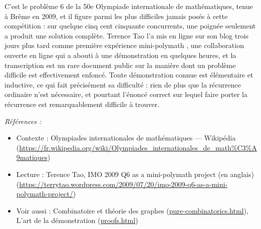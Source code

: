 \documentclass[11pt]{article}
\newenvironment{refs}{\par\small\noindent\emph{Références :}\begin{itemize}\setlength\itemsep{0pt}}{\end{itemize}\normalsize}
\begin{document}
\noindent C'est le problème 6 de la 50e Olympiade internationale de mathématiques, tenue à Brême en 2009, et il figure parmi les plus difficiles jamais posés à cette compétition : sur quelque cinq cent cinquante concurrents, une poignée seulement a produit une solution complète. Terence Tao l'a mis en ligne sur son blog trois jours plus tard comme première expérience \og{} mini-polymath \fg{}, une collaboration ouverte en ligne qui a abouti à une démonstration en quelques heures, et la transcription est un rare document public sur la manière dont un problème difficile est effectivement enfoncé. Toute démonstration connue est élémentaire et inductive, ce qui fait précisément sa difficulté : rien de plus que la récurrence ordinaire n'est nécessaire, et pourtant l'énoncé correct sur lequel faire porter la récurrence est remarquablement difficile à trouver.

\begin{refs}
\item Contexte : Olympiades internationales de mathématiques --- Wikipédia (\url{https://fr.wikipedia.org/wiki/Olympiades_internationales_de_math%C3%A9matiques})
\item Lecture : Terence Tao, \og{} IMO 2009 Q6 as a mini-polymath project \fg{} (en anglais) (\url{https://terrytao.wordpress.com/2009/07/20/imo-2009-q6-as-a-mini-polymath-project/})
\item Voir aussi : Combinatoire et théorie des graphes (\url{pure-combinatorics.html}), L'art de la démonstration (\url{proofs.html})
\end{refs}

\bigskip
\end{document}
